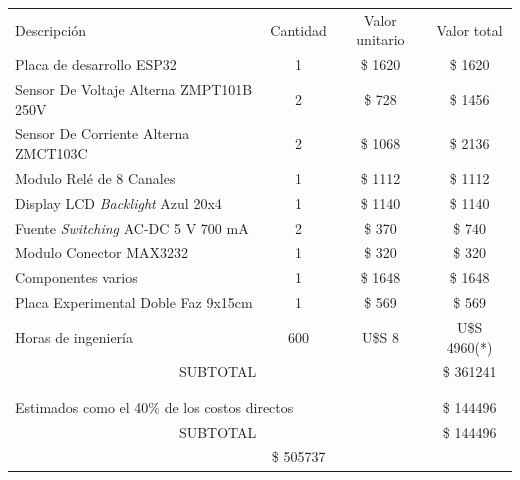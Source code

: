 \documentclass[11pt]{charter}
\begin{document}
\begin{table}[htpb]
\centering
\begin{tabularx}{\linewidth}{@{}|X|c|r|r|@{}}
\hline
\rowcolor[HTML]{C0C0C0} 
\multicolumn{4}{|c|}{\cellcolor[HTML]{C0C0C0}COSTOS DIRECTOS} \\ \hline
\rowcolor[HTML]{C0C0C0} 
Descripción &
  \multicolumn{1}{c|}{\cellcolor[HTML]{C0C0C0}Cantidad} &
  \multicolumn{1}{c|}{\cellcolor[HTML]{C0C0C0}Valor unitario} &
  \multicolumn{1}{c|}{\cellcolor[HTML]{C0C0C0}Valor total} \\ \hline
Placa de desarrollo ESP32 & \multicolumn{1}{c|}{1} & \multicolumn{1}{c|}{\$ 1620} & \multicolumn{1}{c|}{\$ 1620} \\ \hline
Sensor De Voltaje Alterna ZMPT101B 250V & \multicolumn{1}{c|}{2} & \multicolumn{1}{c|}{\$ 728} & \multicolumn{1}{c|}{\$ 1456} \\ \hline
Sensor De Corriente Alterna ZMCT103C & \multicolumn{1}{c|}{2} & \multicolumn{1}{c|}{\$ 1068} & \multicolumn{1}{c|}{\$ 2136} \\ \hline
Modulo Relé de 8 Canales & \multicolumn{1}{c|}{1} & \multicolumn{1}{c|}{\$ 1112} & \multicolumn{1}{c|}{\$ 1112} \\ \hline
Display LCD \textit{Backlight} Azul 20x4 & \multicolumn{1}{c|}{1} & \multicolumn{1}{c|}{\$ 1140} & \multicolumn{1}{c|}{\$ 1140} \\ \hline
Fuente \textit{Switching} AC-DC 5 V 700 mA & \multicolumn{1}{c|}{2} & \multicolumn{1}{c|}{\$ 370} & \multicolumn{1}{c|}{\$ 740} \\ \hline
Modulo Conector MAX3232 & \multicolumn{1}{c|}{1} & \multicolumn{1}{c|}{\$ 320} & \multicolumn{1}{c|}{\$ 320} \\ \hline
Componentes varios & \multicolumn{1}{c|}{1} & \multicolumn{1}{c|}{\$ 1648} & \multicolumn{1}{c|}{\$ 1648} \\ \hline
Placa Experimental Doble Faz 9x15cm & \multicolumn{1}{c|}{1} & \multicolumn{1}{c|}{\$ 569} & \multicolumn{1}{c|}{\$ 569} \\ \hline
Horas de ingeniería & \multicolumn{1}{c|}{600} & \multicolumn{1}{c|}{U\$S 8} & \multicolumn{1}{c|}{U\$S 4960(*)} \\ \hline
\multicolumn{3}{|c|}{SUBTOTAL} &
  \multicolumn{1}{c|}{\$ 361241} \\ \hline
\rowcolor[HTML]{C0C0C0} 
\multicolumn{4}{|c|}{\cellcolor[HTML]{C0C0C0}COSTOS INDIRECTOS} \\ \hline 
\rowcolor[HTML]{C0C0C0} 
\multicolumn{3}{|l|}{Descripción} & \\ \hline
\multicolumn{3}{|l|}{Estimados como el 40\% de los costos directos} & \multicolumn{1}{c|}{\$ 144496} \\ \hline
\multicolumn{3}{|c|}{SUBTOTAL} &
  \multicolumn{1}{c|}{\$ 144496} \\ \hline
\rowcolor[HTML]{C0C0C0}
\multicolumn{3}{|c|}{TOTAL} & \multicolumn{1}{c|}{\$ 505737}
   \\ \hline
\end{tabularx}%
\end{table}
\end{document}
